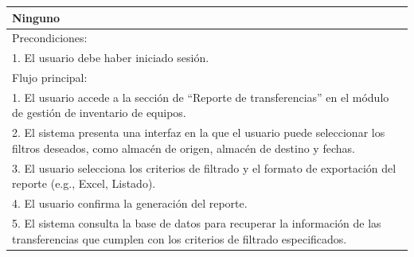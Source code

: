 \documentclass[stu, 12pt, letterpaper, donotrepeattitle, floatsintext, natbib]{apa7}
\begin{document}
\begin{longtable}{@{} p{16.5cm} @{}}
    Ninguno                                                                                                                                                                                                                                                                           \\ \midrule
    Precondiciones:                                                                                                                                                                                                                                                                   \\
    1. El usuario debe haber iniciado sesión.                                                                                                                                                                                                                                         \\ \midrule
    Flujo principal:                                                                                                                                                                                                                                                                  \\
    1. El usuario accede a la sección de ``Reporte de transferencias'' en el módulo de gestión de inventario de equipos.                                                                                                                                                              \\
    2. El sistema presenta una interfaz en la que el usuario puede seleccionar los filtros deseados, como almacén de origen, almacén de destino y fechas.                                                                                                                             \\
    3. El usuario selecciona los criterios de filtrado y el formato de exportación del reporte (e.g., Excel, Listado).                                                                                                                                                                \\
    4. El usuario confirma la generación del reporte.                                                                                                                                                                                                                                 \\
    5. El sistema consulta la base de datos para recuperar la información de las transferencias que cumplen con los criterios de filtrado especificados.                                                                                                                              \\

\end{longtable}
\end{document}
